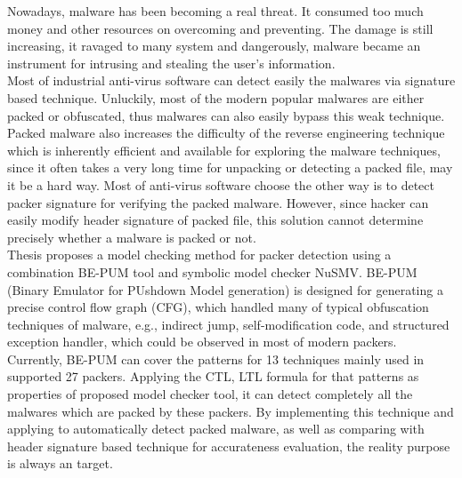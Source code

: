 \setlength\parindent{0pt}

\hspace{0.5cm}Nowadays, malware has been becoming a real threat. It consumed too much money and other resources on overcoming and preventing. The damage is still increasing, it ravaged to many system and dangerously, malware became an instrument for intrusing and stealing the user's information.\\

\hspace{0.5cm}Most of industrial anti-virus software can detect easily the malwares via signature based technique. Unluckily, most of the modern popular malwares are either packed or obfuscated, thus malwares can also easily bypass this weak technique. Packed malware also increases the difficulty of the reverse engineering technique which is inherently efficient and available for exploring the malware techniques, since it often takes a very long time for unpacking or detecting a packed file, may it be a hard way. Most of anti-virus software choose the other way is to detect packer signature for verifying the packed malware. However, since hacker can easily modify header signature of packed file, this solution cannot determine precisely whether a malware is packed or not.\\

\hspace{0.5cm}Thesis proposes a model checking method for packer detection using a combination BE-PUM tool and symbolic model checker NuSMV. BE-PUM (Binary Emulator for PUshdown Model generation) is designed for generating a precise control flow graph (CFG), which handled many of typical obfuscation techniques of malware, e.g., indirect jump, self-modification code, and structured exception handler, which could be observed in most of modern packers. Currently, BE-PUM can cover the patterns for 13 techniques mainly used in supported 27 packers. Applying the CTL, LTL formula for that patterns as properties of proposed model checker tool, it can detect completely all the malwares which are packed by these packers. By implementing this technique and applying to automatically detect packed malware, as well as comparing with header signature based technique for accurateness evaluation, the reality purpose is always an target.
